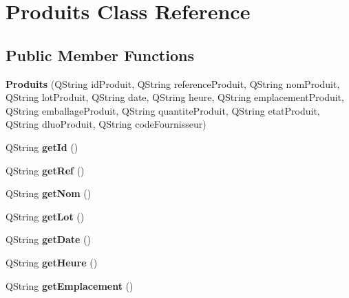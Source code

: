 \hypertarget{class_produits}{}\section{Produits Class Reference}
\label{class_produits}
\subsection*{Public Member Functions}
\begin{DoxyCompactItemize}
\item 
\mbox{\label{class_produits_a15c147533085976d625665764f79fd7b}} 
{\bfseries Produits} (Q\+String id\+Produit, Q\+String reference\+Produit, Q\+String nom\+Produit, Q\+String lot\+Produit, Q\+String date, Q\+String heure, Q\+String emplacement\+Produit, Q\+String emballage\+Produit, Q\+String quantite\+Produit, Q\+String etat\+Produit, Q\+String dluo\+Produit, Q\+String code\+Fournisseur)
\item 
\mbox{\label{class_produits_a3aee7de9dc5c38b50decec407bbd0754}} 
Q\+String {\bfseries get\+Id} ()
\item 
\mbox{\label{class_produits_a0fef797c8b1c1ae2aa5687e53aadb48b}} 
Q\+String {\bfseries get\+Ref} ()
\item 
\mbox{\label{class_produits_a5708325c18db12146f0465448398be84}} 
Q\+String {\bfseries get\+Nom} ()
\item 
\mbox{\label{class_produits_a61d14c4abe4fa116b6a2993feb27bf7f}} 
Q\+String {\bfseries get\+Lot} ()
\item 
\mbox{\label{class_produits_a66bdd66bb570daecc6b5b0401c8eb774}} 
Q\+String {\bfseries get\+Date} ()
\item 
\mbox{\label{class_produits_af33acfbd18f5066923255b746beff1a6}} 
Q\+String {\bfseries get\+Heure} ()
\item 
\mbox{\label{class_produits_a7ac80d42336ae2c0ff848546f5a7234b}} 
Q\+String {\bfseries get\+Emplacement} ()
\item 
\mbox{\label{class_produits_a1f45334c187daa76f7cc89e89165f7d8}} 

\end{DoxyCompactItemize}
